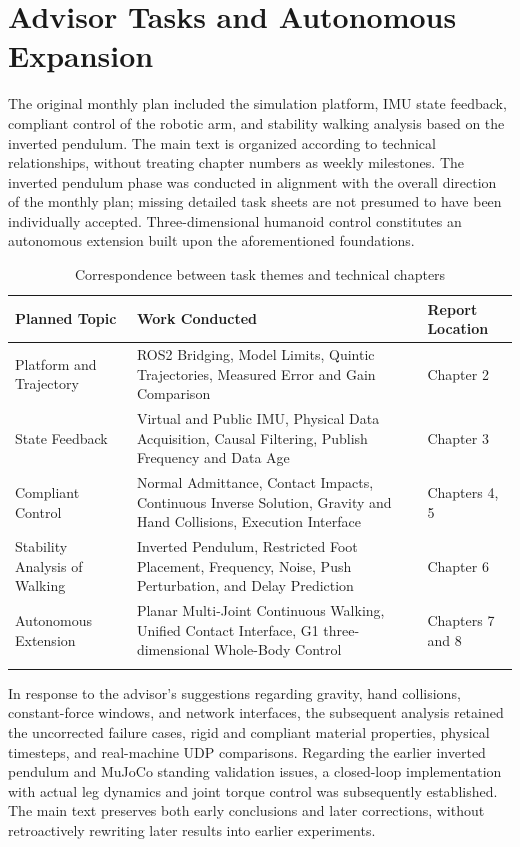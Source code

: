 \section{Advisor Tasks and Autonomous Expansion}
The original monthly plan included the simulation platform, IMU state feedback, compliant control of the robotic arm, and stability walking analysis based on the inverted pendulum. The main text is organized according to technical relationships, without treating chapter numbers as weekly milestones. The inverted pendulum phase was conducted in alignment with the overall direction of the monthly plan; missing detailed task sheets are not presumed to have been individually accepted. Three-dimensional humanoid control constitutes an autonomous extension built upon the aforementioned foundations.
\begin{longtable}{p{.19\linewidth}p{.35\linewidth}p{.35\linewidth}}
\toprule Planned Topic & Work Conducted & Report Location \\\midrule\endhead
Platform and Trajectory & ROS2 Bridging, Model Limits, Quintic Trajectories, Measured Error and Gain Comparison & Chapter 2\\
State Feedback & Virtual and Public IMU, Physical Data Acquisition, Causal Filtering, Publish Frequency and Data Age & Chapter 3\\
Compliant Control & Normal Admittance, Contact Impacts, Continuous Inverse Solution, Gravity and Hand Collisions, Execution Interface & Chapters 4, 5\\
Stability Analysis of Walking & Inverted Pendulum, Restricted Foot Placement, Frequency, Noise, Push Perturbation, and Delay Prediction & Chapter 6\\
Autonomous Extension & Planar Multi-Joint Continuous Walking, Unified Contact Interface, G1 three-dimensional Whole-Body Control & Chapters 7 and 8\\
\bottomrule\caption{Correspondence between task themes and technical chapters}\end{longtable}

In response to the advisor's suggestions regarding gravity, hand collisions, constant-force windows, and network interfaces, the subsequent analysis retained the uncorrected failure cases, rigid and compliant material properties, physical timesteps, and real-machine UDP comparisons. Regarding the earlier inverted pendulum and MuJoCo standing validation issues, a closed-loop implementation with actual leg dynamics and joint torque control was subsequently established. The main text preserves both early conclusions and later corrections, without retroactively rewriting later results into earlier experiments.
